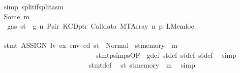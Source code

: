 \begin{isabellebody}
\ {\isacharparenleft}{\kern0pt}simp\ split{\isacharcolon}{\kern0pt}if{\isacharunderscore}{\kern0pt}split{\isacharunderscore}{\kern0pt}asm{\isacharparenright}{\kern0pt}\isanewline
\ \ \ \ \ \ \ \ \ \ \ \ \ \ \ \ \ \ \ \ \ \ \isamarkupfalse%
\isanewline
\ \ \ \ \ \ \ \ \ \ \ \ \ \ \ \ \ \ \ \ \ \ \ \ \isamarkupfalse%
\ {\isacharparenleft}{\kern0pt}Some\ m{\isacharparenright}{\kern0pt}\isanewline
\ \ \ \ \ \ \ \ \ \ \ \ \ \ \ \ \ \ \ \ \ \ \ \ \isamarkupfalse%
\ {\isacharbackquoteopen}{\isasymnot}\ gas\ st\ {\isasymle}\ g{\isacharbackquoteclose}\ n\ Pair\ KCDptr\ Calldata\ MTArray\ n{}\ p{}\ LMemloc\isanewline
\ \ \ \ \ \ \ \ \ \ \ \ \ \ \ \ \ \ \ \ \ \ \ \ \isamarkupfalse%
\ {\isachardoublequoteopen}stmt\ {\isacharparenleft}{\kern0pt}ASSIGN\ lv\ ex{\isacharparenright}{\kern0pt}\ env\ cd\ st\ {\isacharequal}{\kern0pt}\ Normal\ {\isacharparenleft}{\kern0pt}{\isacharparenleft}{\kern0pt}{\isacharparenright}{\kern0pt}{\isacharcomma}{\kern0pt}\ st{\isacharprime}{\kern0pt}{\isacharprime}{\kern0pt}{\isacharprime}{\kern0pt}{\isasymlparr}memory\ {\isacharcolon}{\kern0pt}{\isacharequal}{\kern0pt}\ m{\isasymrparr}{\isacharparenright}{\kern0pt}{\isachardoublequoteclose}\isanewline
\ \ \ \ \ \ \ \ \ \ \ \ \ \ \ \ \ \ \ \ \ \ \ \ \ \ \isamarkupfalse%
\ stmt{\isachardot}{\kern0pt}psimps{\isacharparenleft}{\kern0pt}{}{\isacharparenright}{\kern0pt}{\isacharbrackleft}{\kern0pt}OF\ {}{\isacharparenleft}{\kern0pt}{}{\isacharparenright}{\kern0pt}{\isacharbrackright}{\kern0pt}\ g{\isacharunderscore}{\kern0pt}def\ st{\isacharprime}{\kern0pt}{\isacharunderscore}{\kern0pt}def\ st{\isacharprime}{\kern0pt}{\isacharprime}{\kern0pt}{\isacharunderscore}{\kern0pt}def\ st{\isacharprime}{\kern0pt}{\isacharprime}{\kern0pt}{\isacharprime}{\kern0pt}{\isacharunderscore}{\kern0pt}def\ \isamarkupfalse%
\ simp\isanewline
\ \ \ \ \ \ \ \ \ \ \ \ \ \ \ \ \ \ \ \ \ \ \ \ \isamarkupfalse%
\ stmt{\isacharunderscore}{\kern0pt}def\ \isamarkupfalse%
\ {\isachardoublequoteopen}st{}{\isacharprime}{\kern0pt}{\isacharequal}{\kern0pt}\ {\isacharparenleft}{\kern0pt}st{\isacharprime}{\kern0pt}{\isacharprime}{\kern0pt}{\isacharprime}{\kern0pt}{\isasymlparr}memory\ {\isacharcolon}{\kern0pt}{\isacharequal}{\kern0pt}\ m{\isasymrparr}{\isacharparenright}{\kern0pt}{\isachardoublequoteclose}\ \isamarkupfalse%
\ simp\isanewline
\ \ \ \ \ \ \ \ \ \ \ \ \ \ \ \ \ \ \ \ \ \ \ \ \isamarkupfalse%

\end{isabellebody}
